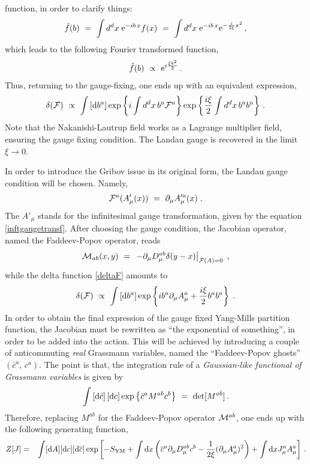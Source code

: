 function, in order to clarify things:
\begin{eqnarray}
\hat{f}(b) ~=~ \int d^{d}x \;\mathrm{e}^{-ib\,x}f(x) ~=~ \int d^{d}x\;
\mathrm{e}^{-ib\,x}\mathrm{e}^{-\frac{i}{2\xi}x^{2}}\,,
\end{eqnarray}
which leads to the following Fourier transformed function,
\begin{eqnarray}
\hat{f}(b) ~\propto~ \mathrm{e}^{i\frac{\xi b^{2}}{2}} \,.
\end{eqnarray}
Thus, returning to the gauge-fixing, one ends up with an equivalent expression,
\begin{eqnarray}
\delta({\cal F}) ~\propto~ \int \left[\mathrm{d} b^{a} \right] \exp\left\{ i\int d^{d}x\, b^{a}{\cal
F}^{a} \right\}   \exp\left\{\frac{i\xi}{2}\int d^{d}x\,b^{a}b^{a}\right\}\,.
\label{deltaF}
\end{eqnarray}
Note that the Nakanishi-Lautrup field works as a Lagrange multiplier field, ensuring the gauge
fixing condition. The Landau gauge is recovered in the limit $\xi \to 0$.

In order to introduce the Gribov issue in its original form, the Landau gauge condition
will be chosen. Namely,
\begin{eqnarray}
\mathcal{F}^a (A'_\mu (x)) ~=~ \partial_{\mu} A_{\mu }^{\prime a} (x) \;.
\label{notideal}
\end{eqnarray}
The $A'_{\mu}$ stands for the infinitesimal gauge transformation, given by the equation
\eqref{inftgaugetransf}.
After choosing the gauge condition, the Jacobian operator, named the Faddeev-Popov operator,
reads 
\begin{eqnarray}\label{mab}
 \mathcal M_{ab} (x,y) ~=~  \left.    - \partial_\mu  D_\mu^{ab} \delta (y-x)    \right|_{ \mathcal
F(A) = 0 } \;,
\label{fpoperator}
\end{eqnarray}
while the delta function \eqref{deltaF} amounts to
\begin{eqnarray}
\delta({\cal F}) ~\propto~ \int \left[\mathrm{d} b^{a} \right] \exp\left\{ ib^{a} \partial_{\mu}A^{a}_{\mu} +
\frac{i\xi}{2}b^{a} b^{a} \right\}\;.
\end{eqnarray}
In order to obtain the final expression of the gauge fixed Yang-Mills partition function, the
Jacobian must be rewritten as ``the exponential of something'', in order to be added into the
action. This will be achieved by introducing a couple of anticommuting {\it real} Grassmann
variables, named the ``Faddeev-Popov ghosts'' $(\bar{c}^{a},\,c^{a})$. The point is that, the
integration rule of a {\it Gaussian-like functional of Grassmann variables} is given by
\begin{eqnarray}
\int \left[ \mathrm{d}\bar{c} \right] \left[ \mathrm{d} c \right] \exp\left\{ \bar{c}^{a} M^{ab} c^{b} \right\}
~=~ \det[M^{ab}]\,.
\end{eqnarray}
Therefore, replacing $M^{ab}$ for the Faddeev-Popov operator ${\cal M}^{ab}$, one ends up with
the following generating function,
\begin{eqnarray}
Z[J] &=&   \int [\mathrm{d} A][\mathrm{d} c] [\mathrm{d} \overline c]         \exp \left[- S_{\mathrm{YM}} + \int \mathrm{d}
x \left(   \overline c^a   \partial_\mu  D_\mu^{ab}  c^b -  \frac{1}{2 \xi} (\partial_\mu A_\mu^a )^2
\right) + \int \mathrm{d} x J_\mu^a A_\mu^a  \right]\,.
\label{genfuncfp}
\end{eqnarray}

